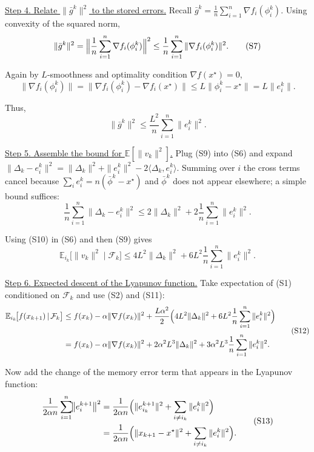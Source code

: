 \documentclass{article}
\newcommand{\E}{\mathbb{E}}
\newcommand{\grad}{\nabla}
\begin{document}
\noindent\underline{Step 4.  Relate $\|\bar g^k\|^2$ to the stored errors.}  
Recall $\bar g^k=\frac1n\sum_{i=1}^n\grad f_i(\phi_i^k)$.
Using convexity of the squared norm,
\[
\|\bar g^k\|^2
= \Bigl\|\frac1n\sum_{i=1}^n \grad f_i(\phi_i^k)\Bigr\|^2
\le \frac1n\sum_{i=1}^n \|\grad f_i(\phi_i^k)\|^2 .
\tag{S7}
\]

Again by $L$‑smoothness and optimality condition $\grad f(x^\star)=0$,
\[
\|\grad f_i(\phi_i^k)\| = \|\grad f_i(\phi_i^k)-\grad f_i(x^\star)\|
\le L\|\phi_i^k-x^\star\| = L\|e_i^k\| .
\tag{S8}
\]

Thus,
\[
\|\bar g^k\|^2 \le \frac{L^2}{n}\sum_{i=1}^n\|e_i^k\|^2 .
\tag{S9}
\]

\noindent\underline{Step 5.  Assemble the bound for $\E[\|v_k\|^2]$.}  
Plug (S9) into (S6) and expand $\|\Delta_k-e_i^k\|^2 = \|\Delta_k\|^2 + \|e_i^k\|^2 -2\langle\Delta_k,e_i^k\rangle$.
Summing over $i$ the cross terms cancel because $\sum_i e_i^k = n(\bar\phi^k - x^\star)$ and $\bar\phi^k$ does not appear elsewhere; a simple bound suffices:
\[
\frac{1}{n}\sum_{i=1}^n\|\Delta_k-e_i^k\|^2
\le 2\|\Delta_k\|^2 + 2\frac{1}{n}\sum_{i=1}^n\|e_i^k\|^2 .
\tag{S10}
\]

Using (S10) in (S6) and then (S9) gives
\[
\E_{i_k}\!\bigl[\|v_k\|^2\mid\mathcal{F}_k\bigr]
\le 4L^2\|\Delta_k\|^2
   + 6L^2\frac{1}{n}\sum_{i=1}^n\|e_i^k\|^2 .
\tag{S11}
\]

\noindent\underline{Step 6.  Expected descent of the Lyapunov function.}  
Take expectation of (S1) conditioned on $\mathcal{F}_k$ and use (S2) and (S11):
\[
\begin{aligned}
\E_{i_k}\!\bigl[f(x_{k+1})\,|\,\mathcal{F}_k\bigr]
&\le f(x_k)-\alpha\|\grad f(x_k)\|^2
   +\frac{L\alpha^2}{2}\Bigl(4L^2\|\Delta_k\|^2
   +6L^2\frac{1}{n}\sum_{i=1}^n\|e_i^k\|^2\Bigr)\\[1mm]
&= f(x_k)-\alpha\|\grad f(x_k)\|^2
   +2\alpha^2L^3\|\Delta_k\|^2
   +3\alpha^2L^3\frac{1}{n}\sum_{i=1}^n\|e_i^k\|^2 .
\end{aligned}
\tag{S12}
\]

Now add the change of the memory error term that appears in the Lyapunov function:
\[
\begin{aligned}
\frac{1}{2\alpha n}\sum_{i=1}^n\!\bigl\|e_i^{k+1}\bigr\|^2
&= \frac{1}{2\alpha n}\Bigl(\|e_{i_k}^{k+1}\|^2
    +\sum_{i\neq i_k}\|e_i^{k}\|^2\Bigr)\\
&= \frac{1}{2\alpha n}\Bigl(\|x_{k+1}-x^\star\|^2
    +\sum_{i\neq i_k}\|e_i^{k}\|^2\Bigr) .
\end{aligned}
\tag{S13}
\]
\end{document}
